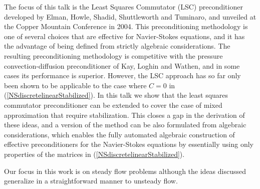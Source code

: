 \documentclass{report}
\begin{document}
The focus of this talk is the Least Squares Commutator (LSC)
preconditioner developed by Elman, Howle, Shadid, Shuttleworth and
Tuminaro, and
unveiled at the Copper Mountain Conference in 2004.
This preconditioning methodology is one of several choices that are
effective for Navier-Stokes equations, and it has the advantage of being
defined from strictly algebraic considerations.
The resulting preconditioning methodology is competitive with the
pressure convection-diffusion preconditioner of Kay, Loghin and Wathen,
and in some cases its performance is superior.
However, the LSC approach has so far only been shown to be applicable to
the case where $C=0$ in (\ref{NSdiscretelinearStabilized}).
In this talk we show that the least squares commutator
preconditioner can be extended to cover the case of mixed
approximation that require stabilization.
This closes a gap in the derivation of these ideas, and a version of the
method can be also formulated from algebraic considerations, which enables
the fully automated algebraic construction of effective preconditioners
for the Navier-Stokes equations by essentially using only properties of the
matrices in (\ref{NSdiscretelinearStabilized}).

Our focus in this work is on steady flow problems although the ideas discussed
generalize in a straightforward manner to unsteady flow.
\end{document}
